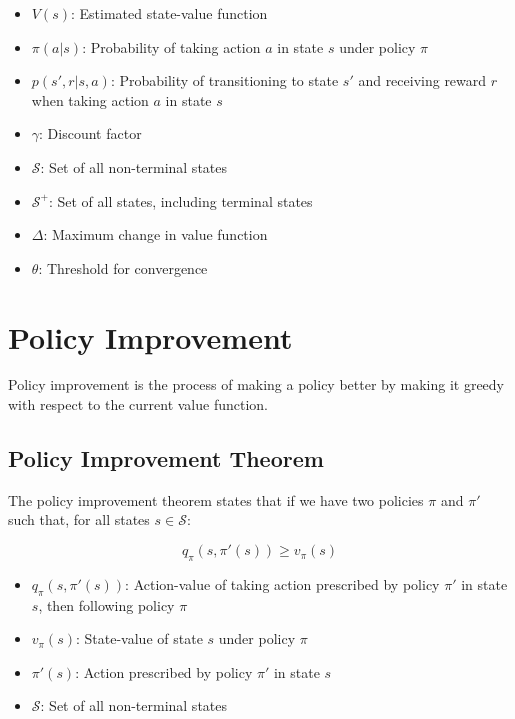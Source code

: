 \documentclass{article}
\begin{document}
\begin{tcolorbox}[colframe=blue!50!black, colback=blue!10, title=Notation Overview]
\begin{itemize}
    \item $V(s)$: Estimated state-value function
    \item $\pi(a|s)$: Probability of taking action $a$ in state $s$ under policy $\pi$
    \item $p(s',r|s,a)$: Probability of transitioning to state $s'$ and receiving reward $r$ when taking action $a$ in state $s$
    \item $\gamma$: Discount factor
    \item $\mathcal{S}$: Set of all non-terminal states
    \item $\mathcal{S}^+$: Set of all states, including terminal states
    \item $\Delta$: Maximum change in value function
    \item $\theta$: Threshold for convergence
\end{itemize}
\end{tcolorbox}

\section{Policy Improvement}

Policy improvement is the process of making a policy better by making it greedy with respect to the current value function.

\subsection{Policy Improvement Theorem}

The policy improvement theorem states that if we have two policies $\pi$ and $\pi'$ such that, for all states $s \in \mathcal{S}$:

\begin{equation}
q_\pi(s, \pi'(s)) \geq v_\pi(s)
\end{equation}

\begin{tcolorbox}[colframe=blue!50!black, colback=blue!10, title=Notation Overview]
\begin{itemize}
    \item $q_\pi(s, \pi'(s))$: Action-value of taking action prescribed by policy $\pi'$ in state $s$, then following policy $\pi$
    \item $v_\pi(s)$: State-value of state $s$ under policy $\pi$
    \item $\pi'(s)$: Action prescribed by policy $\pi'$ in state $s$
    \item $\mathcal{S}$: Set of all non-terminal states
\end{itemize}
\end{tcolorbox}
\end{document}
